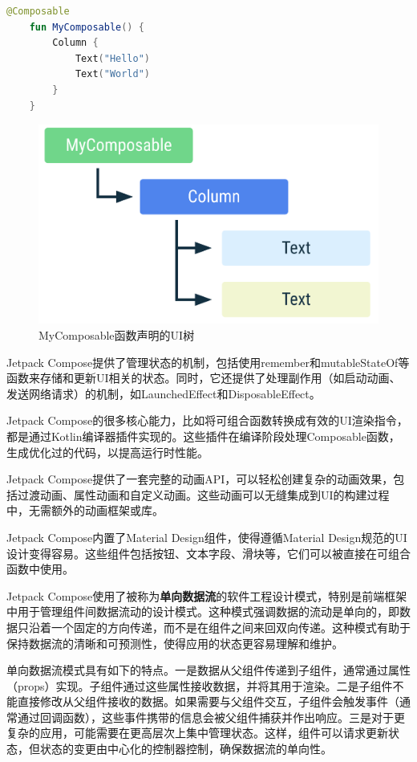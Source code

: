 \documentclass[main.tex]{subfiles}
\begin{document}
\begin{lstlisting}[language=Kotlin]
    @Composable
    fun MyComposable() {
        Column {
            Text("Hello")
            Text("World")
        }
    }
\end{lstlisting}

\begin{figure}
    \centering
    \includegraphics[width=0.9\linewidth]{assets/compose-example.png}
    \caption{MyComposable函数声明的UI树}
    \label{fig:compose-example}
\end{figure}

Jetpack Compose提供了管理状态的机制，包括使用remember和mutableStateOf等函数来存储和更新UI相关的状态。同时，它还提供了处理副作用（如启动动画、发送网络请求）的机制，如LaunchedEffect和DisposableEffect。

Jetpack Compose的很多核心能力，比如将可组合函数转换成有效的UI渲染指令，都是通过Kotlin编译器插件实现的。这些插件在编译阶段处理Composable函数，生成优化过的代码，以提高运行时性能。

Jetpack Compose提供了一套完整的动画API，可以轻松创建复杂的动画效果，包括过渡动画、属性动画和自定义动画。这些动画可以无缝集成到UI的构建过程中，无需额外的动画框架或库。

Jetpack Compose内置了Material Design组件，使得遵循Material Design规范的UI设计变得容易。这些组件包括按钮、文本字段、滑块等，它们可以被直接在可组合函数中使用。

Jetpack Compose使用了被称为\textbf{单向数据流}的软件工程设计模式，特别是前端框架中用于管理组件间数据流动的设计模式。这种模式强调数据的流动是单向的，即数据只沿着一个固定的方向传递，而不是在组件之间来回双向传递。这种模式有助于保持数据流的清晰和可预测性，使得应用的状态更容易理解和维护。

单向数据流模式具有如下的特点。一是数据从父组件传递到子组件，通常通过属性（props）实现。子组件通过这些属性接收数据，并将其用于渲染。二是子组件不能直接修改从父组件接收的数据。如果需要与父组件交互，子组件会触发事件（通常通过回调函数），这些事件携带的信息会被父组件捕获并作出响应。三是对于更复杂的应用，可能需要在更高层次上集中管理状态。这样，组件可以请求更新状态，但状态的变更由中心化的控制器控制，确保数据流的单向性。
\end{document}
